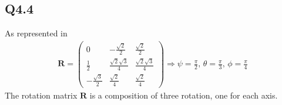 \subsection{Q4.4}
As represented in
\begin{gather*}
	\mathbf{R}= \begin{pmatrix}
		0 & -\frac{\sqrt{2}}{2} & \frac{\sqrt{2}}{2} \\
		\frac{1}{2} & \frac{\sqrt{2}\sqrt{3}}{4} & \frac{\sqrt{2}\sqrt{3}}{4} \\
		-\frac{\sqrt{3}}{2} & \frac{\sqrt{2}}{4} & \frac{\sqrt{2}}{4}
	\end{pmatrix} \Rightarrow
	\psi = \frac{\pi}{2},\,
	\theta = \frac{\pi}{3},\,
	\phi = \frac{\pi}{4}
\end{gather*}
The rotation matrix $\mathbf{R}$ is a composition of three rotation, one for each axis.